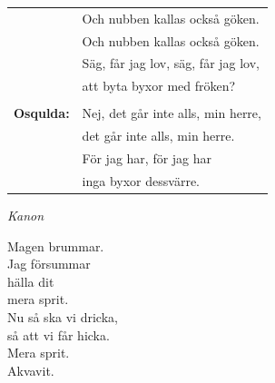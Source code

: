 \documentclass[a6paper,10pt]{article}
\begin{document}
\setlength{\oddsidemargin}{-0.37in}
\noindent
\begin{center}
\end{center}
\vspace{-10pt}
\begin{table}[!h]
\begin{tabularx}{0.85\textwidth}{l l}
\begin{lyrics}
\textbf{\small Osquar:} &\small Och nubben kallas också göken. \\
 &\small Och nubben kallas också göken. \\
 &\small Säg, får jag lov, säg, får jag lov, \\
 &\small att byta byxor med fröken? \\
&\\
\textbf{\small Osqulda:} &\small Nej, det går inte alls, min herre, \\ 
 &\small det går inte alls, min herre. \\
 &\small För jag har, för jag har \\
 &\small inga byxor dessvärre. 
\end{lyrics}
\end{tabularx}
\end{table}
\vspace{20pt}
\begin{center}
\textit{Kanon}
\end{center}
\begin{lyrics}
Magen brummar. \\
Jag försummar \\
hälla dit \\
mera sprit. \\
Nu så ska vi dricka, \\
så att vi får hicka. \\
Mera sprit. \\
Akvavit. 
\end{lyrics}
\end{document}

